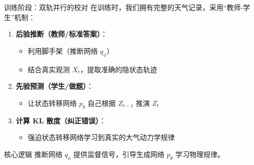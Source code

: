 \documentclass[10pt,aspectratio=1610]{beamer}
\begin{document}
\begin{frame}{训练阶段：双轨并行的校对}
    在训练时，我们拥有完整的天气记录，采用“教师-学生”机制：
    \vspace{0.3cm}
    \begin{enumerate}
        \item \textbf{后验推断（教师/标准答案）}：
              \begin{itemize}
                  \item 利用脚手架（推断网络 $q_\phi$）
                  \item 结合真实观测 $X_t$，提取准确的隐状态轨迹
              \end{itemize}
        \item \textbf{先验预测（学生/做题）}：
              \begin{itemize}
                  \item 让状态转移网络 $p_\theta$ 自己根据 $Z_{t-1}$ 推演 $Z_t$
              \end{itemize}
        \item \textbf{计算 KL 散度（纠正错误）}：
              \begin{itemize}
                  \item 强迫状态转移网络学习到真实的大气动力学规律
              \end{itemize}
    \end{enumerate}
    \vspace{0.3cm}
    \begin{block}{核心逻辑}
        推断网络 $q_\phi$ 提供\alert{监督信号}，引导生成网络 $p_\theta$ 学习物理规律。
    \end{block}
\end{frame}
\end{document}
